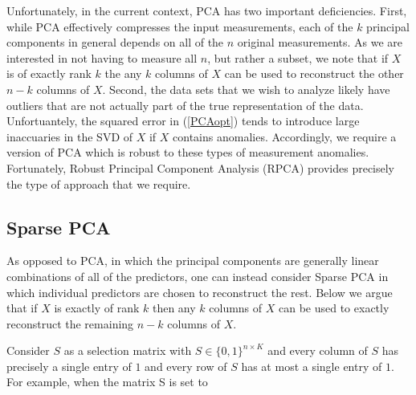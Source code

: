 \documentclass[conference]{IEEEtran}
\begin{document}

Unfortunately, in the current context, PCA has two important deficiencies.  First, while PCA effectively compresses the input measurements, each of the $k$ principal components in general depends on all of the $n$ original measurements.   As we are interested in not having to measure all $n$, but rather a subset, we note that if $X$ is of exactly rank $k$ the any $k$ columns of $X$ can be used to reconstruct the other $n-k$ columns of $X$.
Second, the data sets that we wish to analyze likely have outliers that are not actually part of the true representation of the data.  Unfortuantely, the squared error in (\ref{PCAopt}) tends to introduce large inaccuaries in the SVD of $X$ if $X$ contains anomalies.
Accordingly, we require a version of PCA which is robust to these types of measurement anomalies.   Fortunately, Robust Principal Component Analysis (RPCA) \cite{Candes2009,
 Candes2011, Chandrasekaran2009, Cai2010, Paffenroth2012a,Paffenroth2013b} provides precisely the type of approach that we require.   

\subsection{Sparse PCA}\label{SPCA}

As opposed to PCA, in which the principal components are generally linear combinations of all of the predictors, one can instead consider Sparse PCA \cite{htf01} in which individual predictors are chosen to reconstruct the rest. Below we argue that  if $X$ is exactly of rank $k$ then any $k$ columns of $X$ can be used to exactly reconstruct the remaining $n-k$ columns of $X$.

Consider $S$ as a selection matrix with $S \in \{0,1\}^{n \times K}$ and every column of $S$ has precisely a single entry of $1$ and every row of $S$ has at most a single entry of $1$.
For example, when the matrix S is set to
\end{document}
